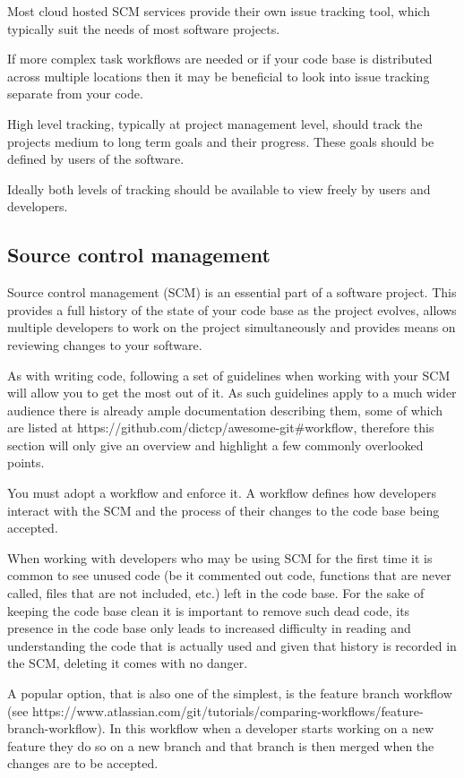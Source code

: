 \documentclass[jnr]{iosart2x}
\begin{document}
Most cloud hosted SCM services provide their own issue tracking tool, which typically suit the needs of most software projects.

If more complex task workflows are needed or if your code base is distributed across multiple locations then it may be beneficial to look into issue tracking separate from your code.

High level tracking, typically at project management level, should track the projects medium to long term goals and their progress.
These goals should be defined by users of the software.

Ideally both levels of tracking should be available to view freely by users and developers.

\subsection{Source control management}
\label{Source control management}

Source control management (SCM) is an essential part of a software project.
This provides a full history of the state of your code base as the project evolves, allows multiple developers to work on the project simultaneously and provides means on reviewing changes to your software.

As with writing code, following a set of guidelines when working with your SCM will allow you to get the most out of it.
As such guidelines apply to a much wider audience there is already ample documentation describing them, some of which are listed at https://github.com/dictcp/awesome-git\#workflow, therefore this section will only give an overview and highlight a few commonly overlooked points.

You must adopt a workflow and enforce it.
A workflow defines how developers interact with the SCM and the process of their changes to the code base being accepted.

When working with developers who may be using SCM for the first time it is common to see unused code (be it commented out code, functions that are never called, files that are not included, etc.) left in the code base.
For the sake of keeping the code base clean it is important to remove such dead code, its presence in the code base only leads to increased difficulty in reading and understanding the code that is actually used and given that history is recorded in the SCM, deleting it comes with no danger.

A popular option, that is also one of the simplest, is the feature branch workflow (see https://www.atlassian.com/git/tutorials/comparing-workflows/feature-branch-workflow).
In this workflow when a developer starts working on a new feature they do so on a new branch and that branch is then merged when the changes are to be accepted.
\end{document}
